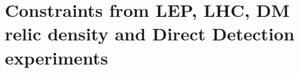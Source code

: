 \section{Constraints from LEP, LHC, DM relic density and Direct Detection experiments}\label{constraints}
